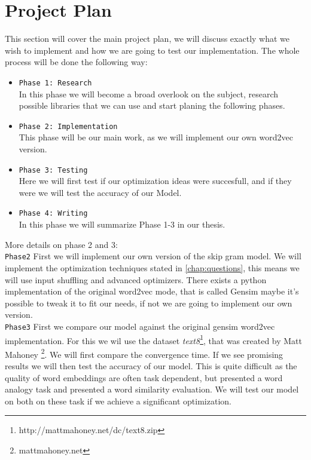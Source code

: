 \chapter{Project Plan}\label{chap:introduction}

This section will cover the main project plan, we will discuss exactly what we wish to implement and how we are going to test our implementation. 
The whole process will be done the following way: 
\begin{itemize}
\item \texttt{Phase 1: Research} \\ In this phase we will become a broad overlook on the subject, research possible libraries that we can use and start planing the following phases.
\item \texttt{Phase 2: Implementation} \\ This phase will be our main work, as we will implement our own word2vec version.
\item \texttt{Phase 3: Testing} \\ Here we will first test if our optimization ideas were succesfull, and if they were we will test the accuracy of our Model. 
\item \texttt{Phase 4: Writing} \\ In this phase we will summarize Phase 1-3 in our thesis. 
\end{itemize}
More details on phase 2 and 3:\\
\texttt{Phase2}
First we will implement our own version of the skip gram model. We will implement the optimization techniques stated in \ref{chap:questions}, this means we will use input shuffling and  advanced optimizers.  There exists a python implementation of the original word2vec mode, that is called Gensim \cite{gensim}maybe it's possible to tweak it to fit our needs, if not we are going to implement our own version. \\
\texttt{Phase3}
First we compare our model against the original gensim word2vec implementation. For this we wil use the dataset \textit{text8}\footnote{ http://mattmahoney.net/dc/text8.zip }, that was created by Matt Mahoney \footnote{mattmahoney.net}. We will first compare the convergence time. If we see promising results we will then test the accuracy of our model. This is quite difficult as the quality of word embeddings are often task dependent, but \cite{mikolov2} presented a word analogy task  and \cite{wSimilarity} presented a  word similarity evaluation. We will test our model on both on these task if we achieve a significant optimization. 

